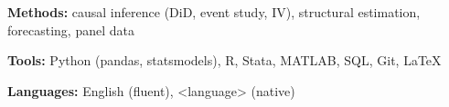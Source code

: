 \textbf{Methods:} causal inference (DiD, event study, IV), structural estimation, forecasting, panel data\par
\textbf{Tools:} Python (pandas, statsmodels), R, Stata, MATLAB, SQL, Git, \LaTeX\par
\textbf{Languages:} English (fluent), <language> (native)
